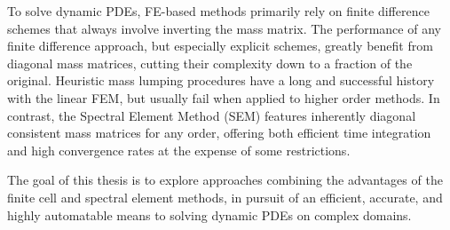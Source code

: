 To solve dynamic PDEs, FE-based methods primarily rely on finite difference schemes that always involve inverting the mass matrix. The performance of any finite difference approach, but especially explicit schemes, greatly benefit from diagonal mass matrices, cutting their complexity down to a fraction of the original. Heuristic mass lumping procedures have a long and successful history with the linear FEM, but usually fail when applied to higher order methods. In contrast, the Spectral Element Method (SEM) features inherently diagonal consistent mass matrices for any order, offering both efficient time integration and high convergence rates at the expense of some restrictions.

The goal of this thesis is to explore approaches combining the advantages of the finite cell and spectral element methods, in pursuit of an efficient, accurate, and highly automatable means to solving dynamic PDEs on complex domains.